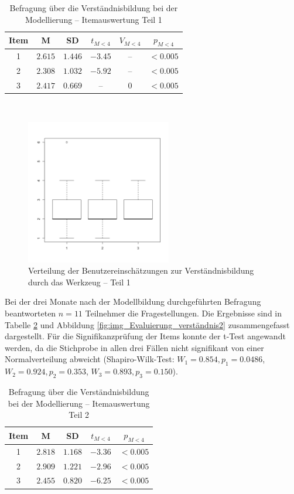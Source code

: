 \begin{table}[htbp]
	\centering
	\caption{Befragung über die Verständnisbildung bei der Modellierung -- Itemauswertung Teil 1}

\begin{tabular}{| c || c | c || c | c | c |}
  \hline
   Item & M & SD & $t_{M<4}$ & $V_{M<4}$ & $p_{M<4}$ \\ \hline
   1  & $2.615$ & $1.446$ & $-3.45$ & -- & $<0.005$ \\ 
   2  & $2.308$ & $1.032$ & $-5.92$ & -- & $<0.005$ \\ 
   3  & $2.417$ & $0.669$ & -- & $0$ & $<0.005$ \\ \hline
\end{tabular} \\ 
	\label{tab:verständnis}
\end{table}

\begin{figure}[htbp]
	\centering
		\includegraphics[height=2.5in]{img/Evaluierung/verstaendnis.png}
	\caption{Verteilung der Benutzereinschätzungen zur Verständnisbildung durch das Werkzeug -- Teil 1}
	\label{fig:img_Evaluierung_verständnis}
\end{figure}

Bei der drei Monate nach der Modellbildung durchgeführten Befragung beantworteten $n=11$ Teilnehmer die Fragestellungen. Die Ergebnisse sind in Tabelle \ref{tab:verständnis2} und Abbildung \ref{fig:img_Evaluierung_verständnis2} zusammengefasst dargestellt. Für die Signifikanzprüfung der Items konnte der t-Test angewandt werden, da die Stichprobe in allen drei Fällen nicht signifikant von einer Normalverteilung abweicht (Shapiro-Wilk-Test: $W_{1}=0.854, p_{1}=0.0486$, $W_{2}=0.924, p_{2}=0.353$, $W_{3}=0.893, p_{3}=0.150$).

\begin{table}[htbp]
	\centering
	\caption{Befragung über die Verständnisbildung bei der Modellierung -- Itemauswertung Teil 2}

\begin{tabular}{| c || c | c || c | c |}
  \hline
   Item & M & SD & $t_{M<4}$ & $p_{M<4}$ \\ \hline
   1  & $2.818$ & $1.168$ & $-3.36$ & $<0.005$ \\ 
   2  & $2.909$ & $1.221$ & $-2.96$ & $<0.005$ \\ 
   3  & $2.455$ & $0.820$ & $-6.25$ & $<0.005$ \\ \hline
\end{tabular} \\ 
	\label{tab:verständnis2}
\end{table}

